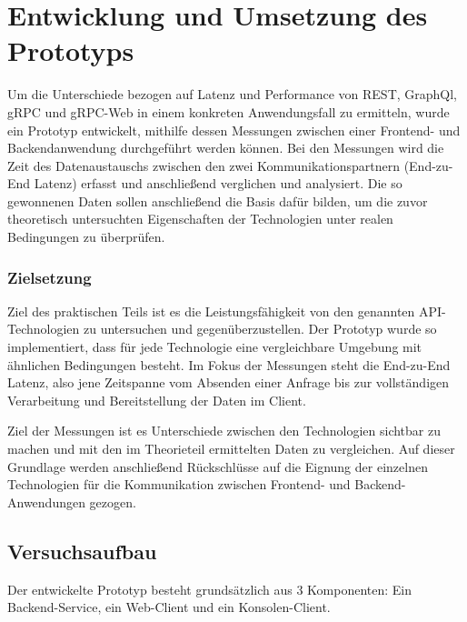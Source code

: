 \chapter{Entwicklung und Umsetzung des Prototyps}
\label{chap:intro}
\chapterstart

Um die Unterschiede bezogen auf Latenz und Performance von REST, GraphQl, gRPC und gRPC-Web in einem konkreten Anwendungsfall zu ermitteln, wurde ein Prototyp entwickelt, mithilfe dessen Messungen zwischen einer Frontend- und Backendanwendung durchgeführt werden können. 
Bei den Messungen wird die Zeit des Datenaustauschs zwischen den zwei Kommunikationspartnern (End-zu-End Latenz) erfasst und anschließend verglichen und analysiert.
Die so gewonnenen Daten sollen anschließend die Basis dafür bilden, 
um die zuvor theoretisch untersuchten Eigenschaften der Technologien unter realen Bedingungen zu überprüfen.

\subsection*{Zielsetzung}
Ziel des praktischen Teils ist es die Leistungsfähigkeit von den genannten API-Technologien zu untersuchen und gegenüberzustellen. Der Prototyp wurde so implementiert, dass für jede Technologie eine vergleichbare Umgebung mit ähnlichen Bedingungen besteht. 
Im Fokus der Messungen steht die End-zu-End Latenz, also jene Zeitspanne vom Absenden einer Anfrage bis zur vollständigen Verarbeitung und Bereitstellung der Daten im Client. 

Ziel der Messungen ist es Unterschiede zwischen den Technologien sichtbar zu machen und mit den im Theorieteil ermittelten Daten zu vergleichen.
Auf dieser Grundlage werden anschließend Rückschlüsse auf die Eignung der einzelnen Technologien für die Kommunikation zwischen Frontend- und Backend-Anwendungen gezogen.


\section{Versuchsaufbau}
Der entwickelte Prototyp besteht grundsätzlich aus 3 Komponenten: 
Ein Backend-Service, ein Web-Client und ein Konsolen-Client.

